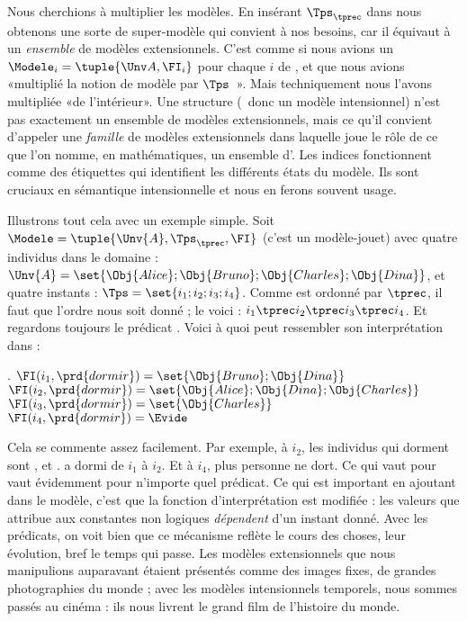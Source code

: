 Nous cherchions à multiplier les modèles. En insérant $\Tps_{\tprec}$ dans {\Modele} nous obtenons une sorte de super-modèle qui convient à nos besoins, car il équivaut à un \emph{ensemble} de modèles extensionnels. C'est comme si nous avions un $\Modele_i=\tuple{\Unv A,\FI_i}$ pour chaque $i$ de {\Tps}, et que nous avions «multiplié la notion de modèle par $\Tps$~». Mais techniquement nous l'avons multipliée «de l'intérieur». Une structure  (\ie\ donc un modèle intensionnel) n'est pas exactement un ensemble de modèles extensionnels, mais ce qu'il convient d'appeler une \emph{famille} de modèles extensionnels dans laquelle {\Tps} joue le rôle de ce que l'on nomme, en mathématiques, un ensemble d'.\label{cf:indices} 
Les indices fonctionnent comme des étiquettes qui identifient les différents états du modèle. Ils sont cruciaux en sémantique intensionnelle et nous en ferons souvent usage.

{Illustrons tout cela avec un exemple simple.}  Soit \(\Modele =
\tuple{\Unv{A},\Tps_{\tprec},\FI}\) (c'est un modèle-jouet) avec 
quatre individus dans le domaine :
\(\Unv{A} = \set{\Obj{Alice}; \Obj{Bruno}; \Obj{Charles};\Obj{Dina}}\),
et quatre instants : \(\Tps = \set{i_1;i_2;i_3;i_4}\).  
Comme {\Tps} est ordonné par $\tprec$, il faut que l'ordre nous soit donné ; le voici : $i_1\tprec i_2 \tprec i_3\tprec i_4$.
Et regardons
toujours le prédicat .  Voici à quoi peut ressembler son
interprétation dans {\Modele} :

\ex. \label{x:ModeleI}
\(
\FI(i_1,\prd{dormir}) = \set{\Obj{Bruno};\Obj{Dina}}
\)
\\
\(
\FI(i_2,\prd{dormir}) = \set{\Obj{Alice};\Obj{Dina};\Obj{Charles}}
\)
\\
\(
\FI(i_3,\prd{dormir}) = \set{\Obj{Charles}}
\)
\\
\(
\FI(i_4,\prd{dormir}) = \Evide
\)



Cela se commente assez facilement.  Par exemple, à $i_2$, les individus
qui dorment sont ,  et .   a dormi de $i_1$ à $i_2$. Et à
$i_4$, plus personne ne dort.
Ce qui vaut pour  vaut évidemment pour n'importe quel prédicat.
Ce qui est important en ajoutant {\Tps} dans le modèle, c'est que
la fonction d'interprétation {\FI} est modifiée : les valeurs que {\FI}
attribue aux constantes non logiques \emph{dépendent} d'un instant
donné.   Avec les prédicats, on voit bien que ce mécanisme reflète le
cours des choses, leur évolution, bref le temps qui passe.  
Les modèles extensionnels que nous manipulions auparavant étaient présentés comme des images fixes, de grandes photographies  du monde ; avec les modèles intensionnels temporels, nous sommes passés au cinéma : ils nous livrent le grand film de l'histoire du monde.


